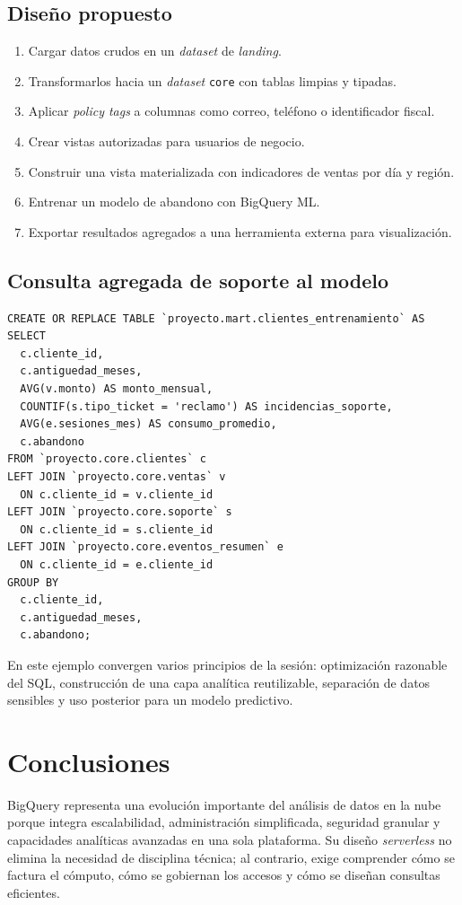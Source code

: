 \documentclass[12pt]{article}
\begin{document}
\subsection{Diseño propuesto}
\begin{enumerate}[label=\textbf{C\arabic*.}, leftmargin=*]
\item Cargar datos crudos en un \textit{dataset} de \textit{landing}.
\item Transformarlos hacia un \textit{dataset} \texttt{core} con tablas limpias y tipadas.
\item Aplicar \textit{policy tags} a columnas como correo, teléfono o identificador fiscal.
\item Crear vistas autorizadas para usuarios de negocio.
\item Construir una vista materializada con indicadores de ventas por día y región.
\item Entrenar un modelo de abandono con BigQuery ML.
\item Exportar resultados agregados a una herramienta externa para visualización.
\end{enumerate}

\subsection{Consulta agregada de soporte al modelo}
\begin{lstlisting}[style=sql, caption={Construcción de una tabla analítica para ML}]
CREATE OR REPLACE TABLE `proyecto.mart.clientes_entrenamiento` AS
SELECT
  c.cliente_id,
  c.antiguedad_meses,
  AVG(v.monto) AS monto_mensual,
  COUNTIF(s.tipo_ticket = 'reclamo') AS incidencias_soporte,
  AVG(e.sesiones_mes) AS consumo_promedio,
  c.abandono
FROM `proyecto.core.clientes` c
LEFT JOIN `proyecto.core.ventas` v
  ON c.cliente_id = v.cliente_id
LEFT JOIN `proyecto.core.soporte` s
  ON c.cliente_id = s.cliente_id
LEFT JOIN `proyecto.core.eventos_resumen` e
  ON c.cliente_id = e.cliente_id
GROUP BY
  c.cliente_id,
  c.antiguedad_meses,
  c.abandono;
\end{lstlisting}

En este ejemplo convergen varios principios de la sesión: optimización razonable del SQL, construcción de una capa analítica reutilizable, separación de datos sensibles y uso posterior para un modelo predictivo.

\section{Conclusiones}
BigQuery representa una evolución importante del análisis de datos en la nube porque integra escalabilidad, administración simplificada, seguridad granular y capacidades analíticas avanzadas en una sola plataforma. Su diseño \textit{serverless} no elimina la necesidad de disciplina técnica; al contrario, exige comprender cómo se factura el cómputo, cómo se gobiernan los accesos y cómo se diseñan consultas eficientes.
\end{document}
